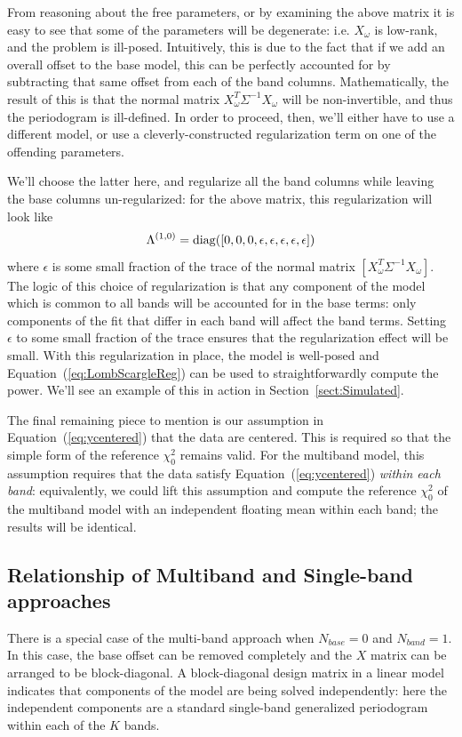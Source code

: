 \documentclass[12pt,preprint]{aastex}
\newcommand{\Eq}[1]{Equation~(\ref{eq:#1})}
\newcommand{\eq}[1]{\Eq{#1}}
\newcommand{\Sect}[1]{Section~\ref{sect:#1}}
\newcommand{\sect}[1]{\Sect{#1}}
\newcommand{\sectlabel}[1]{\label{sect:#1}}
\begin{document}
From reasoning about the free parameters, or by examining the above matrix it is easy to see that some of the parameters will be degenerate: i.e. $X_\omega$ is low-rank, and the problem is ill-posed. Intuitively, this is due to the fact that if we add an overall offset to the base model, this can be perfectly accounted for by subtracting that same offset from each of the band columns. Mathematically, the result of this is that the normal matrix $X_\omega^T\Sigma^{-1}X_\omega$ will be non-invertible, and thus the periodogram is ill-defined. In order to proceed, then, we'll either have to use a different model, or use a cleverly-constructed regularization term on one of the offending parameters.

We'll choose the latter here, and regularize all the band columns while leaving the base columns un-regularized: for the above matrix, this regularization will look like
\begin{equation}
  \Lambda^{(1,0)} = {\rm diag}([0, 0, 0, \epsilon, \epsilon, \epsilon, \epsilon, \epsilon])
\end{equation}
where $\epsilon$ is some small fraction of the trace of the normal matrix $[X_\omega^T\Sigma^{-1}X_\omega]$. The logic of this choice of regularization is that any component of the model which is common to all bands will be accounted for in the base terms: only components of the fit that differ in each band will affect the band terms. Setting $\epsilon$ to some small fraction of the trace ensures that the regularization effect will be small. With this regularization in place, the model is well-posed and \eq{LombScargleReg} can be used to straightforwardly compute the power. We'll see an example of this in action in \sect{Simulated}.

The final remaining piece to mention is our assumption in \eq{ycentered} that the data are centered. This is required so that the simple form of the reference $\chi^2_0$ remains valid. For the multiband model, this assumption requires that the data satisfy \eq{ycentered} {\it within each band}: equivalently, we could lift this assumption and compute the reference $\chi^2_0$ of the multiband model with an independent floating mean within each band; the results will be identical.

\subsection{Relationship of Multiband and Single-band approaches}
\sectlabel{relationship}
There is a special case of the multi-band approach when $N_{base}=0$ and $N_{band}=1$. In this case, the base offset can be removed completely and the $X$ matrix can be arranged to be block-diagonal. A block-diagonal design matrix in a linear model indicates that components of the model are being solved independently: here the independent components are a standard single-band generalized periodogram within each of the $K$ bands.
\end{document}
